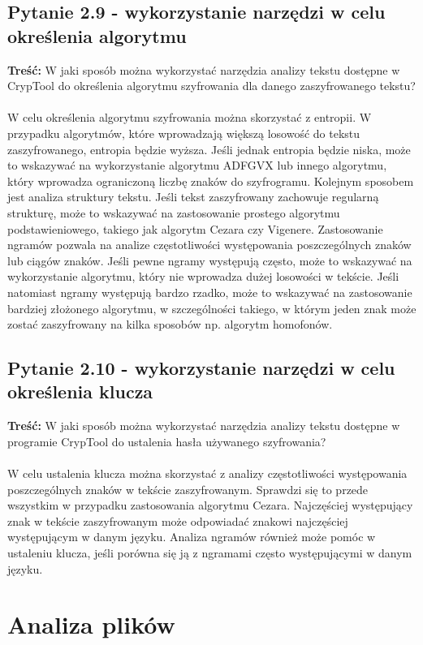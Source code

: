 \documentclass{article}
\begin{document}
\subsection*{Pytanie 2.9 - wykorzystanie narzędzi w celu określenia algorytmu}
\textbf{Treść: } W jaki sposób można wykorzystać narzędzia analizy tekstu dostępne w CrypTool do określenia
algorytmu szyfrowania dla danego zaszyfrowanego tekstu?\\\\
W celu określenia algorytmu szyfrowania można skorzystać z entropii. W przypadku algorytmów, które wprowadzają większą losowość do tekstu zaszyfrowanego, entropia
będzie wyższa. Jeśli jednak entropia będzie niska, może to wskazywać na wykorzystanie algorytmu ADFGVX lub innego algorytmu, który wprowadza ograniczoną liczbę znaków do szyfrogramu.
Kolejnym sposobem jest analiza struktury tekstu. Jeśli tekst zaszyfrowany zachowuje regularną strukturę, może to wskazywać na zastosowanie prostego algorytmu podstawieniowego, takiego jak
algorytm Cezara czy Vigenere. Zastosowanie ngramów pozwala na analize częstotliwości występowania poszczególnych znaków lub ciągów znaków. Jeśli pewne ngramy występują często,
może to wskazywać na wykorzystanie algorytmu, który nie wprowadza dużej losowości w tekście. Jeśli natomiast ngramy występują bardzo rzadko, może to wskazywać na zastosowanie
bardziej złożonego algorytmu, w szczególności takiego, w którym jeden znak może zostać zaszyfrowany na kilka sposobów np. algorytm homofonów.

\subsection*{Pytanie 2.10 - wykorzystanie narzędzi w celu określenia klucza}
\textbf{Treść: } W jaki sposób można wykorzystać narzędzia analizy tekstu dostępne w programie CrypTool
do ustalenia hasła używanego szyfrowania?\\\\
W celu ustalenia klucza można skorzystać z analizy częstotliwości występowania poszczególnych znaków w tekście zaszyfrowanym. Sprawdzi się to przede wszystkim
w przypadku zastosowania algorytmu Cezara. Najczęściej występujący znak w tekście zaszyfrowanym może odpowiadać znakowi najczęściej występującym w danym języku.
Analiza ngramów również może pomóc w ustaleniu klucza, jeśli porówna się ją z ngramami często występującymi w danym języku.
\section{Analiza plików}
\end{document}
